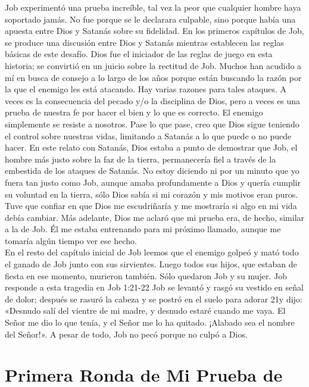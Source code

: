 \documentclass[twoside, 12pt]{book}
\begin{document}
Job experimentó una prueba increíble, tal vez la peor que cualquier hombre haya soportado jamás. No fue porque se le declarara culpable, sino porque había una apuesta entre Dios y Satanás sobre su fidelidad. En los primeros capítulos de Job, se produce una discusión entre Dios y Satanás mientras establecen las reglas básicas de este desafío. Dios fue el iniciador de las reglas de juego en esta historia; se convirtió en un juicio sobre la rectitud de Job. Muchos han acudido a mí en busca de consejo a lo largo de los años porque están buscando la razón por la que el enemigo les está atacando. Hay varias razones para tales ataques. A veces es la consecuencia del pecado y/o la disciplina de Dios, pero a veces es una prueba de nuestra fe por hacer el bien y lo que es correcto. El enemigo simplemente se resiste a nosotros. Pase lo que pase, creo que Dios sigue teniendo el control sobre nuestras vidas, limitando a Satanás a lo que puede o no puede hacer. En este relato con Satanás, Dios estaba a punto de demostrar que Job, el hombre más justo sobre la faz de la tierra, permanecería fiel a través de la embestida de los ataques de Satanás. No estoy diciendo ni por un minuto que yo fuera tan justo como Job, aunque amaba profundamente a Dios y quería cumplir su voluntad en la tierra, sólo Dios sabía si mi corazón y mis motivos eran puros. Tuve que confiar en que Dios me escudriñaría y me mostraría si algo en mi vida debía cambiar. Más adelante, Dios me aclaró que mi prueba era, de hecho, similar a la de Job. Él me estaba entrenando para mi próximo llamado, aunque me tomaría algún tiempo ver ese hecho.\\

En el resto del capítulo inicial de Job leemos que el enemigo golpeó y mató todo el ganado de Job junto con sus sirvientes. Luego todos sus hijos, que estaban de fiesta en ese momento, murieron también. Sólo quedaron Job y su mujer. Job responde a esta tragedia en Job 1:21-22 Job se levantó y rasgó su vestido en señal de dolor; después se rasuró la cabeza y se postró en el suelo para adorar 21y dijo: «Desnudo salí del vientre de mi madre, y desnudo estaré cuando me vaya. El Señor me dio lo que tenía, y el Señor me lo ha quitado. ¡Alabado sea el nombre del Señor!». A pesar de todo, Job no pecó porque no culpó a Dios.\\

\section{Primera Ronda de Mi Prueba de}
\end{document}
